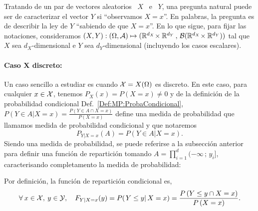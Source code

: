 
\label{Ssec:MP:LeyesCondicionales}

Tratando de un par de vectores aleatorios  \ $X$ \ e \ $Y$, una pregunta natural
puede ser de caracterizar el vector  $Y$ si ``observamos $X = x$''. En palabras,
la pregunta es de describir la ley de $Y$ ``sabiendo de que $X = x$''. En lo que
sigue, para  fijar las notaciones, consideramos  $(X,Y): ( \Omega  , \mathcal{A}) \mapsto
(\mathbb{R}^{d_X} \! \times \mathbb{R}^{d_Y} \, , \, \mathcal{B}(\mathbb{R}^{d_X} \! \times \mathbb{R}^{d_Y})
)$ tal que $X$ sea $d_X$-dimensional e $Y$ sea $d_Y$-dimensional (incluyendo los
casos escalares).



\paragraph{Caso $\boldsymbol{X}$ discreto:}
Un caso  sencillo a estudiar  es cuando $\mathcal{X}  = X(\Omega)$ es discreto.   En este
caso, para  cualquier $x  \in \mathcal{X}$, tenemos  $P_X(x) = P(X  = x)  \ne 0$ y  de la
definici\'on de  la probabilidad condicional Def.~\ref{Def:MP:ProbaCondicional},
$P(Y \in A | X = x) = \frac{P(Y \in A \cap X = x)}{P(X=x)}$ define una medida de
probabilidad que llamamos medida de probabilidad condicional y que notaremos
%
\[
P_{Y|X=x}(A) = P(Y \in A | X = x).
\]
%
Siendo una medida de probabilidad, se puede referirse a la subsecci\'on anterior
para  definir  una  funci\'on   de  repartici\'on  tomando  $\displaystyle  A  =
\prod_{i=1}^d (-\infty \, ; \,  y_i]$, caracterisando completamento la medida de
probabilidad:
%
\begin{definicion}
  Por definici\'on, la funci\'on de repartici\'on condicional es,
  \[
  \forall \:  x \in  \mathcal{X}, \: y  \in \mathcal{Y}, \quad  F_{Y|X=x}(y) =  P( \left. Y  \le y
  \right|  X =  x  ) =  \frac{P\left(Y  \le y  \cap X  =  x \right)}{P\left(X  =
      x\right)}.
  \]
\end{definicion}

